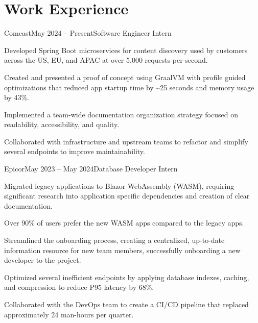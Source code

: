 \documentclass[letterpaper,11pt]{article}
\begin{document}
\section{Work Experience}
\begin{entries}
    \item\begin{experience}{Comcast}{May 2024 -- Present}{Software Engineer Intern}{}
        \item Developed Spring Boot microservices for content discovery used by
            customers across the US, EU, and APAC at over 5,000 requests per second.
        \item Created and presented a proof of concept using GraalVM with
            profile guided optimizations that reduced app startup time by \sim25
            seconds and memory usage by 43\%.
        \item Implemented a team-wide documentation organization strategy
            focused on readability, accessibility, and quality. %
        \item Collaborated with infrastructure and upstream teams to refactor
            and simplify several endpoints to improve maintainability.
    \end{experience}

    \item\begin{experience}{Epicor}{May 2023 -- May 2024}{Database Developer Intern}{}
        \item Migrated legacy applications to Blazor WebAssembly (WASM), requiring
            significant research into application specific dependencies and
            creation of clear documentation.
        \item Over 90\% of users prefer the new WASM apps compared to the legacy
            apps.
        \item Streamlined the onboarding process, creating a centralized,
            up-to-date information resource for new team members, successfully
            onboarding a new developer to the project.
        \item Optimized several inefficient endpoints by applying database indexes,
            caching, and compression to reduce P95 latency by 68\%.
        \item Collaborated with the DevOps team to create a CI/CD pipeline that
            replaced approximately 24 man-hours per quarter.
    \end{experience}
\end{entries}
\end{document}
